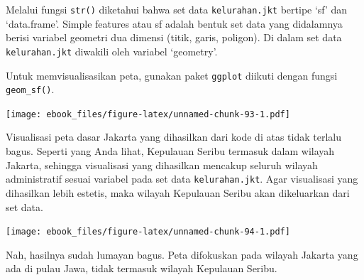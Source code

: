 \documentclass[openany]{book}
\newenvironment{Shaded}{\begin{snugshade}}{\end{snugshade}}
\newcommand{\KeywordTok}[1]{\textcolor[rgb]{0.13,0.29,0.53}{\textbf{#1}}}
\newcommand{\StringTok}[1]{\textcolor[rgb]{0.31,0.60,0.02}{#1}}
\newcommand{\CommentTok}[1]{\textcolor[rgb]{0.56,0.35,0.01}{\textit{#1}}}
\newcommand{\OperatorTok}[1]{\textcolor[rgb]{0.81,0.36,0.00}{\textbf{#1}}}
\newcommand{\NormalTok}[1]{#1}
\begin{document}
Melalui fungsi \texttt{str()} diketahui bahwa set data
\texttt{kelurahan.jkt} bertipe `sf' dan `data.frame'. Simple features
atau sf adalah bentuk set data yang didalamnya berisi variabel geometri
dua dimensi (titik, garis, poligon). Di dalam set data
\texttt{kelurahan.jkt} diwakili oleh variabel `geometry'.

Untuk memvisualisasikan peta, gunakan paket \texttt{ggplot} diikuti
dengan fungsi \texttt{geom\_sf()}.

\begin{Shaded}
\end{Shaded}

\texttt{[image: ebook\_files/figure-latex/unnamed-chunk-93-1.pdf]}

Visualisasi peta dasar Jakarta yang dihasilkan dari kode di atas tidak
terlalu bagus. Seperti yang Anda lihat, Kepulauan Seribu termasuk dalam
wilayah Jakarta, sehingga visualisasi yang dihasilkan mencakup seluruh
wilayah administratif sesuai variabel pada set data
\texttt{kelurahan.jkt}. Agar visualisasi yang dihasilkan lebih estetis,
maka wilayah Kepulauan Seribu akan dikeluarkan dari set data.

\begin{Shaded}
\end{Shaded}

\texttt{[image: ebook\_files/figure-latex/unnamed-chunk-94-1.pdf]}

Nah, hasilnya sudah lumayan bagus. Peta difokuskan pada wilayah Jakarta
yang ada di pulau Jawa, tidak termasuk wilayah Kepulauan Seribu.
\end{document}
